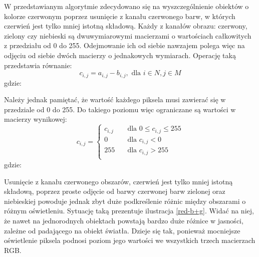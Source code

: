 W przedstawianym algorytmie zdecydowano się na wyszczególnienie obiektów o kolorze czerwonym poprzez usunięcie z kanału czerwonego barw, w których czerwień jest tylko mniej istotną składową. Każdy z kanałów obrazu: czerwony, zielony czy niebieski są dwuwymiarowymi macierzami o wartościach całkowitych z przedziału od 0 do 255. Odejmowanie ich od siebie nawzajem polega więc na odjęciu od siebie dwóch macierzy o jednakowych wymiarach. Operację taką przedstawia równanie:
\begin{equation}
c_{i,j} = a_{i,j} - b_{i,j}, \text{	dla	} i \in N, j \in M
\label{eq:odejmowanie}
\end{equation}
gdzie:
\begin{equationDescriptor}
\end{equationDescriptor}
Należy jednak pamiętać, że wartość każdego piksela musi zawierać się w przedziale od 0 do 255. Do takiego poziomu więc ograniczane są wartości w macierzy wynikowej:
\begin{equation}
c_{i,j} =
  \begin{cases}
    c_{i,j}	& \quad \text{dla } 0 \leq c_{i,j} \leq 255\\
    0	& \quad \text{dla } c_{i,j} < 0\\
    255	& \quad \text{dla } c_{i,j} > 255\\
  \end{cases}
\label{eq:progowanie}
\end{equation}
gdzie:
\begin{equationDescriptor}
\end{equationDescriptor}
Usunięcie z kanału czerwonego obszarów, czerwień jest tylko mniej istotną składową, poprzez proste odjęcie od barwy czerwonej barw zielonej oraz niebieskiej powoduje jednak zbyt duże podkreślenie różnic między obszarami o różnym oświetleniu. Sytuację taką prezentuje ilustracja \ref{red-b+g}. Widać na niej, że nawet na jednorodnych obiektach powstają bardzo duże różnice w jasności, zależne od padającego na obiekt światła. Dzieje się tak, ponieważ mocniejsze oświetlenie piksela podnosi poziom jego wartości we wszystkich trzech macierzach RGB.\newpage
